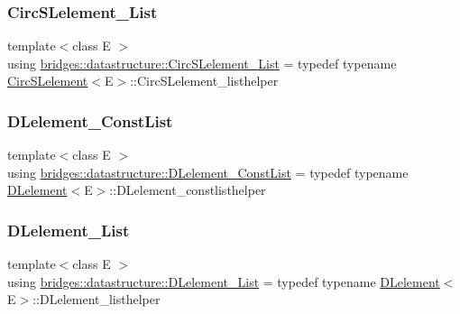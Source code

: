\mbox{\label{namespacebridges_1_1datastructure_a0369e2cdb6565569ce7fe329c66d1faf}} 
\subsubsection{\texorpdfstring{Circ\+S\+Lelement\+\_\+\+List}{CircSLelement\_List}}
{\footnotesize\ttfamily template$<$class E $>$ \\
using \hyperlink{namespacebridges_1_1datastructure_a0369e2cdb6565569ce7fe329c66d1faf}{bridges\+::datastructure\+::\+Circ\+S\+Lelement\+\_\+\+List} = typedef typename \hyperlink{classbridges_1_1datastructure_1_1_circ_s_lelement}{Circ\+S\+Lelement}$<$E$>$\+::Circ\+S\+Lelement\+\_\+listhelper}

\mbox{\label{namespacebridges_1_1datastructure_a89a5bc532207f3279ad747ba91e75527}} 
\subsubsection{\texorpdfstring{D\+Lelement\+\_\+\+Const\+List}{DLelement\_ConstList}}
{\footnotesize\ttfamily template$<$class E $>$ \\
using \hyperlink{namespacebridges_1_1datastructure_a89a5bc532207f3279ad747ba91e75527}{bridges\+::datastructure\+::\+D\+Lelement\+\_\+\+Const\+List} = typedef typename \hyperlink{classbridges_1_1datastructure_1_1_d_lelement}{D\+Lelement}$<$E$>$\+::D\+Lelement\+\_\+constlisthelper}

\mbox{\label{namespacebridges_1_1datastructure_a3bc755a675bce8fd5e0fefd10bb72977}} 
\subsubsection{\texorpdfstring{D\+Lelement\+\_\+\+List}{DLelement\_List}}
{\footnotesize\ttfamily template$<$class E $>$ \\
using \hyperlink{namespacebridges_1_1datastructure_a3bc755a675bce8fd5e0fefd10bb72977}{bridges\+::datastructure\+::\+D\+Lelement\+\_\+\+List} = typedef typename \hyperlink{classbridges_1_1datastructure_1_1_d_lelement}{D\+Lelement}$<$E$>$\+::D\+Lelement\+\_\+listhelper}

